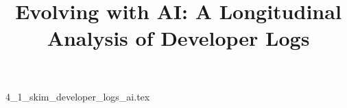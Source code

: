 \documentclass{article}      %
\title{Evolving with AI: A Longitudinal Analysis of Developer Logs}  %
\begin{document}

\maketitle                   %



{4_1_skim_developer_logs_ai.tex}
\printbibliography
\end{document}
